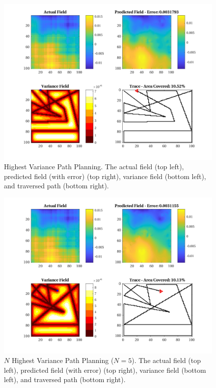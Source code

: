 \begin{figure}[htb!]
    \centering
    \includegraphics[width=0.8\linewidth]{figures/sim_figures/nhv_10p_100x100_sf_50_seed_2.png}
	\captionsetup{skip=0.25\baselineskip}
	\ssp
    \caption{Highest Variance Path Planning. The actual field (top left), predicted field (with error) (top right), variance field (bottom left), and traversed path (bottom right).}
\end{figure}

\begin{figure}[htb!]
    \centering
    \includegraphics[width=0.8\linewidth]{figures/sim_figures/nnhv_10p_100x100_sf_50_seed_2}
    \captionsetup{skip=0.25\baselineskip}
    \ssp
    \caption{$N$ Highest Variance Path Planning ($N=5$). The actual field (top left), predicted field (with error) (top right), variance field (bottom left), and traversed path (bottom right).}
\end{figure}

